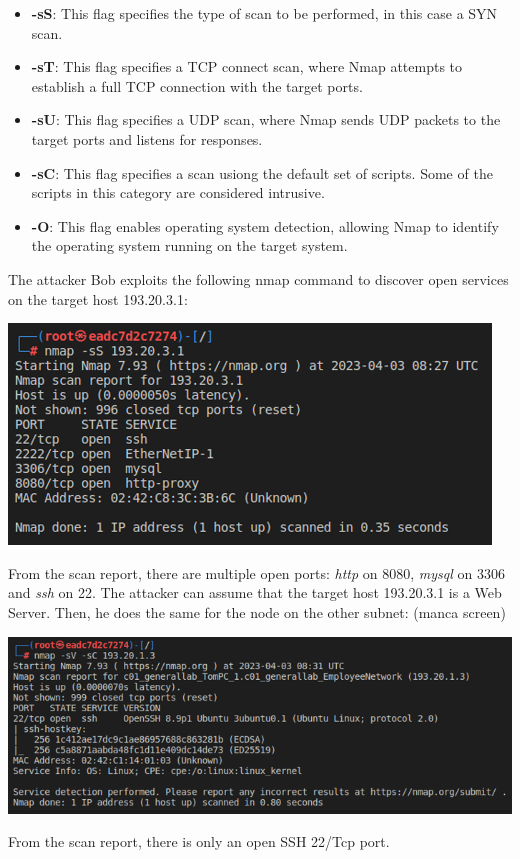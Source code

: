 \documentclass[a4paper, 12pt, oneside]{extbook}
\begin{document}
\begin{itemize}
  \item \textbf{-sS}: This flag specifies the type of scan to be performed, in this case a SYN scan.
  \item \textbf{-sT}: This flag specifies a TCP connect scan, where Nmap attempts to establish a full TCP connection with the target ports.
  \item \textbf{-sU}: This flag specifies a UDP scan, where Nmap sends UDP packets to the target ports and listens for responses.
  \item \textbf{-sC}: This flag specifies a scan usiong the default set of scripts. Some of the scripts in this category are considered intrusive.
  \item \textbf{-O}: This flag enables operating system detection, allowing Nmap to identify the operating system running on the target system.
\end{itemize}
The attacker Bob exploits the following nmap command to discover open services on the target host 193.20.3.1:
\begin{center}
  \includegraphics[scale=0.76]{../Image/scanning_company_ss.PNG}
\end{center}
From the scan report, there are multiple open ports: \textit{http} on 8080, \textit{mysql} on 3306 and \textit{ssh} on 22. The attacker can assume that the target host 193.20.3.1 is a Web Server.
\newline Then, he does the same for the node on the other subnet: (manca screen)
\begin{center}
  \includegraphics[scale=0.76]{../Image/enumeration_tom_sv.PNG}
\end{center}
From the scan report, there is only an open SSH 22/Tcp port.
\end{document}
